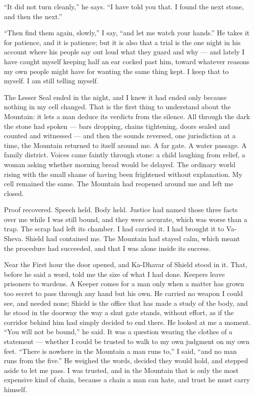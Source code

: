 ``It did not turn cleanly,'' he says. ``I have told you that. I found the next stone, and then the next.''\par
 
``Then find them again, slowly,'' I say, ``and let me watch your hands.'' He takes it for patience, and it is patience; but it is also that a trial is the one night in his account where his people say out loud what they guard and why --- and lately I have caught myself keeping half an ear cocked past him, toward whatever reasons my own people might have for wanting the same thing kept. I keep that to myself. I am still telling myself.\par
 
\ornament
 
The Lesser Seal ended in the night, and I knew it had ended only because nothing in my cell changed. That is the first thing to understand about the Mountain: it lets a man deduce its verdicts from the silence. All through the dark the stone had spoken --- bars dropping, chains tightening, doors sealed and counted and witnessed --- and then the sounds reversed, one jurisdiction at a time, the Mountain returned to itself around me. A far gate. A water passage. A family district. Voices came faintly through stone: a child laughing from relief, a woman asking whether morning bread would be delayed. The ordinary world rising with the small shame of having been frightened without explanation. My cell remained the same. The Mountain had reopened around me and left me closed.\par
 
Proof recovered. Speech held. Body held. Justice had named those three facts over me while I was still bound, and they were accurate, which was worse than a trap. The scrap had left its chamber. I had carried it. I had brought it to Va-Sheva. Shield had contained me. The Mountain had stayed calm, which meant the procedure had succeeded, and that I was alone inside its success.\par
 
Near the First hour the door opened, and Ka-Dhavar of Shield stood in it. That, before he said a word, told me the size of what I had done. Keepers leave prisoners to wardens. A Keeper comes for a man only when a matter has grown too secret to pass through any hand but his own. He carried no weapon I could see, and needed none; Shield is the office that has made a study of the body, and he stood in the doorway the way a shut gate stands, without effort, as if the corridor behind him had simply decided to end there. He looked at me a moment. ``You will not be bound,'' he said. It was a question wearing the clothes of a statement --- whether I could be trusted to walk to my own judgment on my own feet. ``There is nowhere in the Mountain a man runs to,'' I said, ``and no man runs from the five.'' He weighed the words, decided they would hold, and stepped aside to let me pass. I was trusted, and in the Mountain that is only the most expensive kind of chain, because a chain a man can hate, and trust he must carry himself.\par
 
